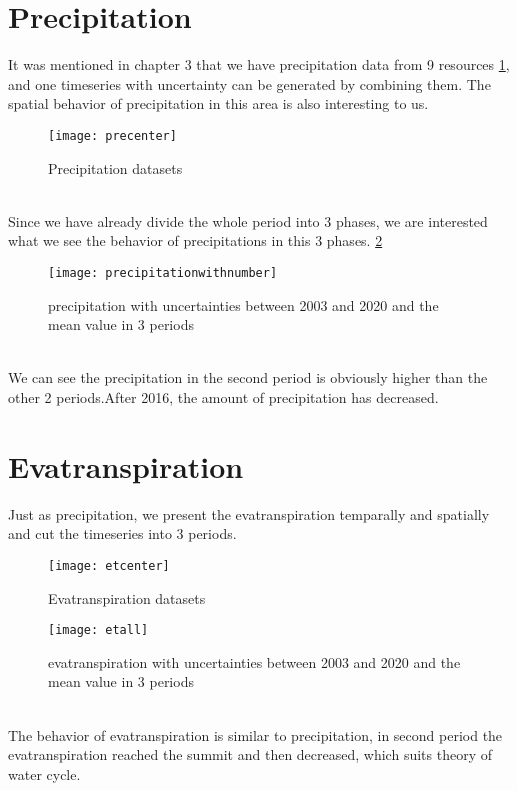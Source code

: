 \section{Precipitation}
It was mentioned in chapter 3 that we have precipitation data from 9 resources \ref{fig:precenter}, and one timeseries with uncertainty can be generated by combining them. The spatial behavior of precipitation in this area is also interesting to us. 
\begin{figure}[htbp]
	\centering
	\texttt{[image: precenter]} %
	\caption{Precipitation datasets} 
	\label{fig:precenter}
\end{figure}
\\
Since we have already divide the whole period into 3 phases, we are interested what we see the behavior of precipitations in this 3 phases. \ref{fig:allpre}
\begin{figure}[htbp]
	\centering
	\texttt{[image: precipitationwithnumber]} %
	\caption{precipitation with uncertainties between 2003 and 2020 and the mean value in 3 periods} 
	\label{fig:allpre}
\end{figure}
\\
We can see the precipitation in the second period is obviously higher than the other 2 periods.After 2016, the amount of precipitation has decreased. 
\clearpage
\section{Evatranspiration}
Just as precipitation, we present the evatranspiration temparally and spatially and cut the timeseries into 3 periods. 
\begin{figure}[htbp]
	\centering
	\texttt{[image: etcenter]} %
	\caption{Evatranspiration datasets} 
	\label{fig:etcenter}
\end{figure}
\begin{figure}[htbp]
	\centering
	\texttt{[image: etall]} %
	\caption{evatranspiration with uncertainties between 2003 and 2020 and the mean value in 3 periods} 
	\label{fig:etall}
\end{figure}
\\
The behavior of evatranspiration is similar to precipitation, in second period the evatranspiration reached the summit and then decreased, which suits theory of water cycle.  
\clearpage
